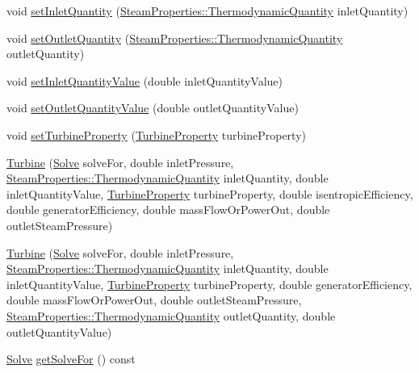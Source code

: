 \begin{DoxyCompactItemize}
void \hyperlink{class_turbine_aecc05c70870fb11bbc0bb4fe5d8438bd}{set\+Inlet\+Quantity} (\hyperlink{class_steam_properties_ae0294bedf7d178c2d8fb6aed0f62fbff}{Steam\+Properties\+::\+Thermodynamic\+Quantity} inlet\+Quantity)
\item 
void \hyperlink{class_turbine_ad5ff4ba1657aac9519a6841336ec571c}{set\+Outlet\+Quantity} (\hyperlink{class_steam_properties_ae0294bedf7d178c2d8fb6aed0f62fbff}{Steam\+Properties\+::\+Thermodynamic\+Quantity} outlet\+Quantity)
\item 
void \hyperlink{class_turbine_ac01a053462c83e21ecc2158e75477542}{set\+Inlet\+Quantity\+Value} (double inlet\+Quantity\+Value)
\item 
void \hyperlink{class_turbine_ab37326068f633280de8f8144b9c8eb89}{set\+Outlet\+Quantity\+Value} (double outlet\+Quantity\+Value)
\item 
void \hyperlink{class_turbine_abb3f16cefe52f4e9c7b32b2bb17a68ee}{set\+Turbine\+Property} (\hyperlink{class_turbine_a5db4f65cf2539e3837684d53221ade12}{Turbine\+Property} turbine\+Property)
\item 
\hyperlink{class_turbine_a3c3c871b9fe57d48dd06b109794381dc}{Turbine} (\hyperlink{class_turbine_a9fd7beba6c6f071e228fbe3e07969d2b}{Solve} solve\+For, double inlet\+Pressure, \hyperlink{class_steam_properties_ae0294bedf7d178c2d8fb6aed0f62fbff}{Steam\+Properties\+::\+Thermodynamic\+Quantity} inlet\+Quantity, double inlet\+Quantity\+Value, \hyperlink{class_turbine_a5db4f65cf2539e3837684d53221ade12}{Turbine\+Property} turbine\+Property, double isentropic\+Efficiency, double generator\+Efficiency, double mass\+Flow\+Or\+Power\+Out, double outlet\+Steam\+Pressure)
\item 
\hyperlink{class_turbine_a1ec182906c075407882de542954d9030}{Turbine} (\hyperlink{class_turbine_a9fd7beba6c6f071e228fbe3e07969d2b}{Solve} solve\+For, double inlet\+Pressure, \hyperlink{class_steam_properties_ae0294bedf7d178c2d8fb6aed0f62fbff}{Steam\+Properties\+::\+Thermodynamic\+Quantity} inlet\+Quantity, double inlet\+Quantity\+Value, \hyperlink{class_turbine_a5db4f65cf2539e3837684d53221ade12}{Turbine\+Property} turbine\+Property, double generator\+Efficiency, double mass\+Flow\+Or\+Power\+Out, double outlet\+Steam\+Pressure, \hyperlink{class_steam_properties_ae0294bedf7d178c2d8fb6aed0f62fbff}{Steam\+Properties\+::\+Thermodynamic\+Quantity} outlet\+Quantity, double outlet\+Quantity\+Value)
\item 
\hyperlink{class_turbine_a9fd7beba6c6f071e228fbe3e07969d2b}{Solve} \hyperlink{class_turbine_a58c73057a4b890eab2af2b42c82484e6}{get\+Solve\+For} () const

\end{DoxyCompactItemize}
